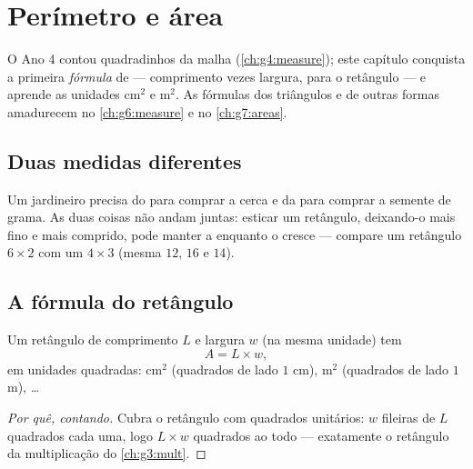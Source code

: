 \chapter{Perímetro e área}\label{ch:g5:areas}

O Ano 4 contou quadradinhos da malha (\cref{ch:g4:measure}); este
capítulo conquista a primeira \emph{fórmula} de  --- comprimento
vezes largura, para o retângulo --- e aprende as unidades cm$^2$ e
m$^2$. As fórmulas dos triângulos e de outras formas amadurecem no
\cref{ch:g6:measure} e no \cref{ch:g7:areas}.

\section{Duas medidas diferentes}

\begin{example}\label{ex:g5:areas:contrast}
Um jardineiro precisa do \emph{} para comprar a cerca e da
\emph{} para comprar a semente de grama. As duas coisas não
andam juntas: esticar um retângulo, deixando-o mais fino e mais
comprido, pode manter a  enquanto o  cresce --- compare
um retângulo $6 \times 2$ com um $4 \times 3$ (mesma  $12$,
 $16$ e $14$).
\end{example}

\section{A fórmula do retângulo}

\begin{proposition}\label{prop:g5:areas:rectangle}
Um retângulo de comprimento $L$ e largura $w$ (na mesma unidade) tem
\[
A = L \times w ,
\]
em unidades quadradas: cm$^2$ (quadrados de lado $1$ cm), m$^2$
(quadrados de lado $1$ m), \dots
\end{proposition}

\begin{proof}[Por quê, contando]
Cubra o retângulo com quadrados unitários: $w$ fileiras de $L$
quadrados cada uma, logo $L \times w$ quadrados ao todo ---
exatamente o retângulo da multiplicação do \cref{ch:g3:mult}.
\end{proof}

